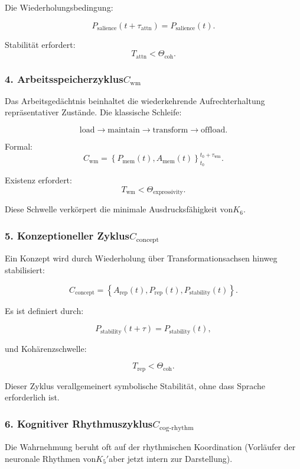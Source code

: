 Die Wiederholungsbedingung:

\[
  P_{\mathrm{salience}}(t+\tau_{\mathrm{attn}}) = P_{\mathrm{salience}}(t).
\]

Stabilität erfordert:
\[
  T_{\mathrm{attn}} < \Theta_{\mathrm{coh}}.
\]

\subsubsection{4. Arbeitsspeicherzyklus$C_{\mathrm{wm}}$}

Das Arbeitsgedächtnis beinhaltet die wiederkehrende Aufrechterhaltung repräsentativer Zustände.
Die klassische Schleife:

\[
 \mathrm{load}
 \to
 \mathrm{maintain}
 \to
 \mathrm{transform}
 \to
 \mathrm{offload}.
\]

Formal:
\[
 C_{\mathrm{wm}} = 
 \left\{
   P_{\mathrm{mem}}(t), A_{\mathrm{mem}}(t)
 \right\}_{t_0}^{t_0+\tau_{\mathrm{wm}}}.
\]

Existenz erfordert:
\[
 T_{\mathrm{wm}} < \Theta_{\mathrm{expressivity}}.
\]

Diese Schwelle verkörpert die minimale Ausdrucksfähigkeit von$K_6$.

\subsubsection{5. Konzeptioneller Zyklus$C_{\mathrm{concept}}$}

Ein Konzept wird durch Wiederholung über Transformationsachsen hinweg stabilisiert:

\[
  C_{\mathrm{concept}}
    = \left\{
      A_{\mathrm{rep}}(t),
      P_{\mathrm{rep}}(t),
      P_{\mathrm{stability}}(t)
    \right\}.
\]

Es ist definiert durch:

\[
  P_{\mathrm{stability}}(t+\tau) = P_{\mathrm{stability}}(t),
\]

und Kohärenzschwelle:

\[
  T_{\mathrm{rep}} < \Theta_{\mathrm{coh}}.
\]

Dieser Zyklus verallgemeinert symbolische Stabilität, ohne dass Sprache erforderlich ist.

\subsubsection{6. Kognitiver Rhythmuszyklus$C_{\mathrm{cog\text{-}rhythm}}$}

Die Wahrnehmung beruht oft auf der rhythmischen Koordination (Vorläufer der
neuronale Rhythmen von$K_5'$aber jetzt intern zur Darstellung).

